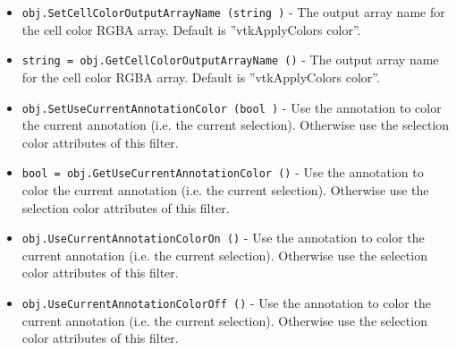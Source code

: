 \begin{itemize}
\item  \verb|obj.SetCellColorOutputArrayName (string )| -  The output array name for the cell color RGBA array.
 Default is ''vtkApplyColors color''.

\item  \verb|string = obj.GetCellColorOutputArrayName ()| -  The output array name for the cell color RGBA array.
 Default is ''vtkApplyColors color''.

\item  \verb|obj.SetUseCurrentAnnotationColor (bool )| -  Use the annotation to color the current annotation
 (i.e. the current selection). Otherwise use the selection
 color attributes of this filter.

\item  \verb|bool = obj.GetUseCurrentAnnotationColor ()| -  Use the annotation to color the current annotation
 (i.e. the current selection). Otherwise use the selection
 color attributes of this filter.

\item  \verb|obj.UseCurrentAnnotationColorOn ()| -  Use the annotation to color the current annotation
 (i.e. the current selection). Otherwise use the selection
 color attributes of this filter.

\item  \verb|obj.UseCurrentAnnotationColorOff ()| -  Use the annotation to color the current annotation
 (i.e. the current selection). Otherwise use the selection
 color attributes of this filter.

\end{itemize}
